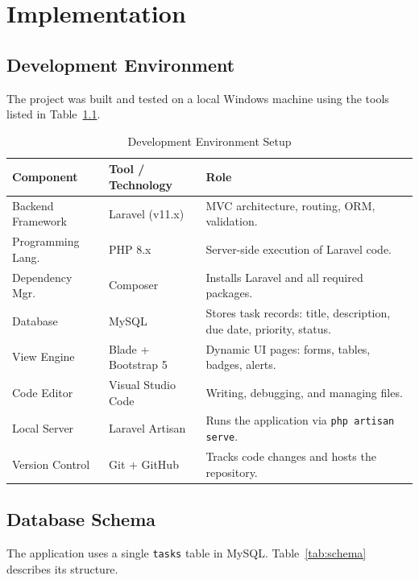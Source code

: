 \documentclass[12pt,a4paper]{report}
\begin{document}
\chapter{Implementation}

\section{Development Environment}

The project was built and tested on a local Windows machine using the tools listed in
Table~\ref{tab:devenv}.

\begin{table}[h!]
\centering
\caption{Development Environment Setup}
\label{tab:devenv}
\renewcommand{\arraystretch}{1.3}
\begin{tabularx}{\textwidth}{@{}llX@{}}
\toprule
\textbf{Component} & \textbf{Tool / Technology} & \textbf{Role} \\
\midrule
Backend Framework  & Laravel (v11.x)     & MVC architecture, routing, ORM, validation. \\
Programming Lang.  & PHP 8.x             & Server-side execution of Laravel code. \\
Dependency Mgr.    & Composer            & Installs Laravel and all required packages. \\
Database           & MySQL               & Stores task records: title, description, due date, priority, status. \\
View Engine        & Blade + Bootstrap 5 & Dynamic UI pages: forms, tables, badges, alerts. \\
Code Editor        & Visual Studio Code  & Writing, debugging, and managing files. \\
Local Server       & Laravel Artisan     & Runs the application via \texttt{php artisan serve}. \\
Version Control    & Git + GitHub        & Tracks code changes and hosts the repository. \\
\bottomrule
\end{tabularx}
\end{table}

\section{Database Schema}

The application uses a single \texttt{tasks} table in MySQL. Table~\ref{tab:schema}
describes its structure.
\end{document}
